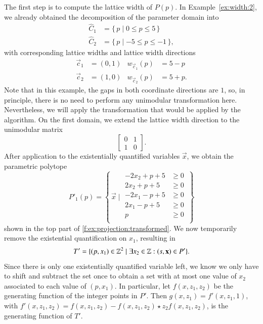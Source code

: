 \begin{example}
The first step is to compute the lattice width of $P(p)$.
In Example~\ref{ex:width:2}, we already obtained the decomposition
of the parameter domain into
$$
\begin{aligned}
\hat C_1 &= \{\, p \mid 0 \le p \le 5 \,\} \\
\hat C_2 &= \{\, p \mid -5 \le p \le -1 \,\}
,
\end{aligned}
$$
with corresponding lattice widths and lattice width directions
$$
\begin{aligned}
\vec c_1 &= (0,1) & w_{\vec c_1}(p) &= 5-p \\
\vec c_2 &= (1,0) & w_{\vec c_2}(p) &= 5+p
.
\end{aligned}
$$
Note that in this example, the gaps in both coordinate directions
are $1$, so, in principle, there is no need to perform any unimodular
transformation here.  Nevertheless, we will apply the transformation
that would be applied by the algorithm.
On the first domain, we extend the lattice width direction
to the unimodular matrix
$$
\begin{bmatrix}
0 & 1 \\
1 & 0
\end{bmatrix}
.
$$
After application to the existentially quantified variables $\vec x$,
we obtain the parametric polytope
$$
P'_1(p) = \left\{\,
\vec x \mid
\begin{aligned}
-2 x_2 + p + 5 &\ge 0 \\
2 x_2 + p + 5 &\ge 0 \\
-2 x_1 - p + 5 &\ge 0 \\
2 x_1 - p + 5 &\ge 0 \\
p & \ge 0 \\
\end{aligned}
\,\right\}
$$
shown in the top part of \autoref{f:ex:projection:transformed}.
We now temporarily remove the existential quantification on $x_1$,
resulting in
$$
T' = \{ (p, x_1) \in \ZZ^2 \mid \exists x_2 \in \ZZ : (s, \vec x) \in P' \}
.
$$
Since there is only one existentially quantified variable left,
we know we only have to shift and subtract the set once to obtain
a set with at most one value of $x_2$ associated to each value
of $(p, x_1)$.
In particular, let $f(x,z_1,z_2)$ be the generating function
of the integer points in $P'$.  Then $g(x,z_1) = f'(x,z_1,1)$, with
$f'(x,z_1,z_2) = f(x,z_1,z_2) - f(x,z_1,z_2) \star z_2 f(x,z_1,z_2)$,
is the generating function of $T'$.


\end{example}
